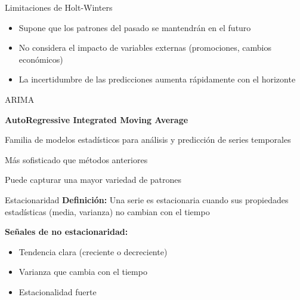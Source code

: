 \documentclass{beamer}
\begin{document}
\begin{frame}{Limitaciones de Holt-Winters}
    \begin{itemize}
        \item Supone que los patrones del pasado se mantendrán en el futuro
        \item No considera el impacto de variables externas (promociones, cambios económicos)
        \item La incertidumbre de las predicciones aumenta rápidamente con el horizonte
    \end{itemize}
\end{frame}

\begin{frame}{ARIMA}
    \begin{center}
        \Large{\textbf{AutoRegressive Integrated Moving Average}}
        
        \vspace{0.8cm}
        
        Familia de modelos estadísticos para análisis y predicción de series temporales
        
        \vspace{0.5cm}
        
        Más sofisticado que métodos anteriores
        
        \vspace{0.5cm}
        
        Puede capturar una mayor variedad de patrones
    \end{center}
\end{frame}

\begin{frame}{Estacionaridad}
    \textbf{Definición:} Una serie es estacionaria cuando sus propiedades estadísticas (media, varianza) no cambian con el tiempo
    
    \vspace{0.5cm}
    
    \textbf{Señales de no estacionaridad:}
    \begin{itemize}
        \item Tendencia clara (creciente o decreciente)
        \item Varianza que cambia con el tiempo
        \item Estacionalidad fuerte
    \end{itemize}
\end{frame}
\end{document}
